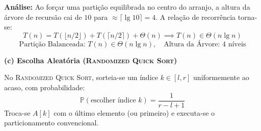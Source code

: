 \documentclass[11pt,a4paper]{article}
\newcommand{\res}[1]{\[\boxed{#1}\]}
\newcommand{\topico}[1]{\par\medskip\textbf{\color{azul}#1}\par}
\begin{document}
\begin{center}
\end{center}

\textbf{Análise:} Ao forçar uma partição equilibrada no centro do arranjo, a altura da árvore de recursão cai de $10$ para $\approx \lceil \lg 10 \rceil = 4$. A relação de recorrência torna-se:
\[
T(n) = T(\lfloor n/2 \rfloor) + T(\lceil n/2 \rceil) + \Theta(n) \implies T(n) \in \Theta(n \lg n)
\]
\res{\text{Partição Balanceada: } T(n) \in \Theta(n \lg n), \quad \text{Altura da Árvore: } 4 \text{ níveis}}

\topico{(c) Escolha Aleatória (\textsc{Randomized Quick Sort})}
No \textsc{Randomized Quick Sort}, sorteia-se um índice $k \in [l, r]$ uniformemente ao acaso, com probabilidade:
\[
\mathbb{P}(\text{escolher índice } k) = \frac{1}{r - l + 1}
\]
Troca-se $A[k]$ com o último elemento (ou primeiro) e executa-se o particionamento convencional.
\end{document}

